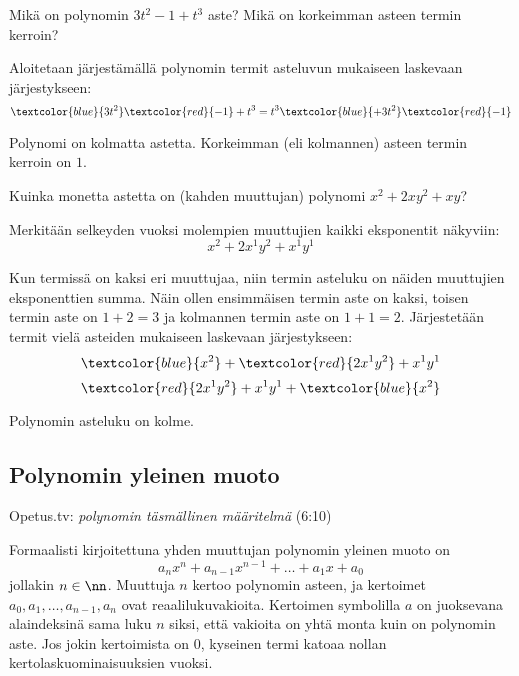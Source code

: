 
\begin{esimerkki}
	Mikä on polynomin $3t^2-1+t^3$ aste? Mikä on korkeimman asteen termin kerroin?
\begin{esimratk}
Aloitetaan järjestämällä polynomin termit asteluvun mukaiseen laskevaan järjestykseen: \\
	  \[\textcolor{blue}{3t^2}\textcolor{red}{-1}+t^3= t^3\textcolor{blue}{+3t^2}\textcolor{red}{-1}\]
\end{esimratk}

\begin{esimvast}
Polynomi on kolmatta astetta. Korkeimman (eli kolmannen) asteen termin kerroin on $1$.
\end{esimvast}

\end{esimerkki}
\newpage
\begin{esimerkki}
Kuinka monetta astetta on (kahden muuttujan) polynomi $x^2+2xy^2+xy$?
	\begin{esimratk}
Merkitään selkeyden vuoksi molempien muuttujien kaikki eksponentit näkyviin: \\
\[x^2+2x^1y^2+x^1y^1\]

Kun termissä on kaksi eri muuttujaa, niin termin asteluku on näiden muuttujien eksponenttien summa. Näin ollen ensimmäisen termin aste on kaksi, toisen termin aste on $1+2=3$ ja kolmannen termin aste on $1+1=2$. Järjestetään termit vielä asteiden mukaiseen laskevaan järjestykseen:
\[\textcolor{blue}{x^2}+\textcolor{red}{2x^1y^2}+x^1y^1\]
\[\textcolor{red}{2x^1y^2}+x^1y^1+\textcolor{blue}{x^2}\]
	\end{esimratk} 
	\begin{esimvast}
		Polynomin asteluku on kolme.
	\end{esimvast}
\end{esimerkki}

\subsection{Polynomin yleinen muoto}

{Opetus.tv: \emph{polynomin täsmällinen määritelmä} (6:10)}

Formaalisti kirjoitettuna yhden muuttujan polynomin yleinen muoto on
\[a_n x^n + a_{n-1} x^{n-1} + \ldots + a_1 x + a_0 \] 
jollakin $n\in\nn$. Muuttuja $n$ kertoo polynomin asteen, ja kertoimet $a_0, a_1, \ldots, a_{n-1}, a_n$ ovat reaalilukuvakioita. Kertoimen symbolilla $a$ on juoksevana alaindeksinä sama luku $n$ siksi, että vakioita on yhtä monta kuin on polynomin aste. Jos jokin kertoimista on $0$, kyseinen termi katoaa nollan kertolaskuominaisuuksien vuoksi.

